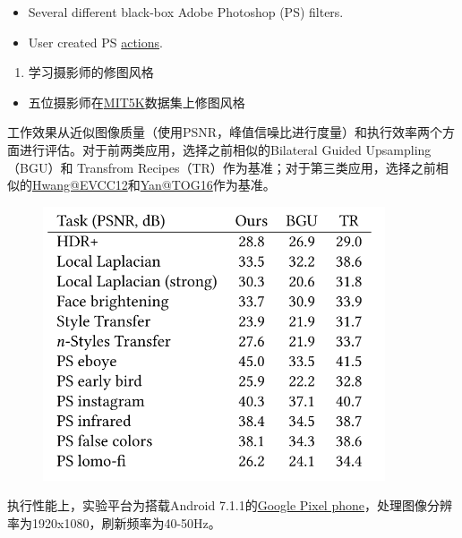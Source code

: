 \begin{itemize}
\item
  Several different black-box Adobe Photoshop (PS) filters.
\item
  User created PS
  \href{https://designbump.com/photoshop-actions-for-instagram-effects/}{actions}.
\end{itemize}

\begin{enumerate}
\def\labelenumi{\arabic{enumi}.}
\item
  学习摄影师的修图风格
\end{enumerate}

\begin{itemize}
\item
  五位摄影师在\href{http://data.csail.mit.edu/graphics/fivek/}{MIT5K}数据集上修图风格
\end{itemize}

工作效果从近似图像质量（使用PSNR，峰值信噪比进行度量）和执行效率两个方面进行评估。对于前两类应用，选择之前相似的Bilateral
Guided Upsampling（BGU）和 Transfrom
Recipes（TR）作为基准；对于第三类应用，选择之前相似的\href{http://www.sungjuhwang.com/files/hwang12a.pdf}{Hwang@EVCC12}和\href{https://arxiv.org/abs/1412.7725}{Yan@TOG16}作为基准。

\begin{figure}
\centering
\includegraphics[width=0.9\textwidth]{./images/DeepBilateralLearning03.png}
\caption{}
\end{figure}

执行性能上，实验平台为搭载Android
7.1.1的\href{https://store.google.com/product/pixel_compare}{Google
Pixel phone}，处理图像分辨率为1920x1080，刷新频率为40-50Hz。

